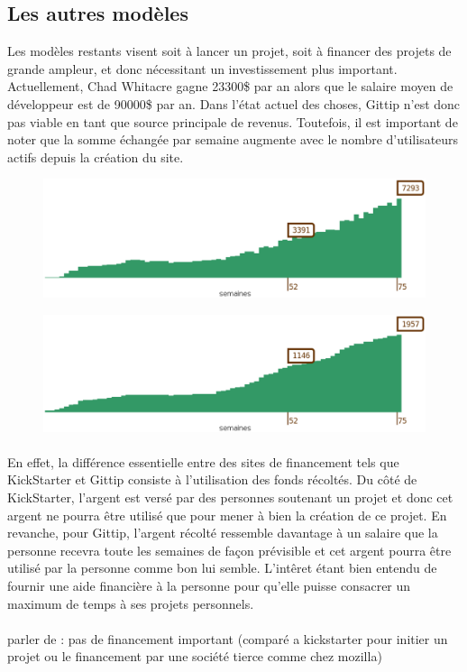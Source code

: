 \subsection{Les autres modèles}

Les modèles restants visent soit à lancer un projet, soit à financer des
projets de grande ampleur, et donc nécessitant un investissement plus
important.  Actuellement, Chad Whitacre gagne 23300\$ par an alors que le
salaire moyen de développeur est de 90000\$ par an. Dans l'état actuel des
choses, Gittip n'est donc pas viable en tant que source principale de revenus.
Toutefois, il est important de noter que la somme échangée par semaine augmente
avec le nombre d'utilisateurs actifs depuis la création du site.

\begin{figure}[h!]  \centering
\includegraphics[width=16cm]{images/gittip_amount.eps} \end{figure}
\begin{figure}[h!] 
\centering \includegraphics[width=16cm]{images/gittip_user.eps} \end{figure}

\paragraph{} En effet, la différence essentielle entre des sites de financement
tels que KickStarter et Gittip consiste à l'utilisation des fonds récoltés. Du
côté de KickStarter, l'argent est versé par des personnes soutenant un projet
et donc cet argent ne pourra être utilisé que pour mener à bien la création de
ce projet. En revanche, pour Gittip, l'argent récolté ressemble davantage à un
salaire que la personne recevra toute les semaines de façon prévisible et cet
argent pourra être utilisé par la personne comme bon lui semble. L'intêret
étant bien entendu de fournir une aide financière à la personne pour qu'elle
puisse consacrer un maximum de temps à ses projets personnels.

\paragraph{} parler de : pas de financement important (comparé a kickstarter
pour initier un projet ou le financement par une société tierce comme chez
mozilla)


